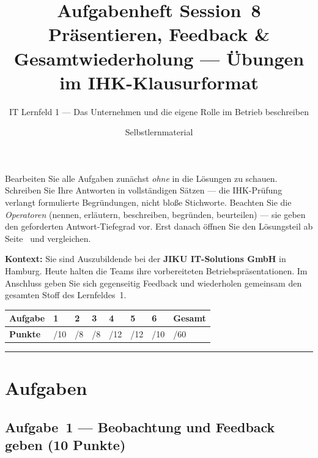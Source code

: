 \documentclass[11pt, a4paper]{article}
\title{\vspace*{-1.5cm}\Huge\bfseries\color{bfwPrimaryDark}Aufgabenheft Session~8\\[0.4em]
  \large\color{bfwInkSoft}\textnormal{Präsentieren, Feedback \& Gesamtwiederholung --- Übungen im IHK-Klausurformat}}
\author{\textsf{IT Lernfeld 1 --- Das Unternehmen und die eigene Rolle im Betrieb beschreiben}}
\date{Selbstlernmaterial}
\begin{document}
\maketitle
\thispagestyle{empty}

\begin{merksatz}[title={\bfseries So nutzen Sie dieses Aufgabenheft}]
Bearbeiten Sie alle Aufgaben zunächst \emph{ohne} in die Lösungen zu schauen. Schreiben
Sie Ihre Antworten in vollständigen Sätzen --- die IHK-Prüfung verlangt formulierte
Begründungen, nicht bloße Stichworte. Beachten Sie die \emph{Operatoren} (nennen,
erläutern, beschreiben, begründen, beurteilen) --- sie geben den geforderten
Antwort-Tiefegrad vor. Erst danach öffnen Sie den Lösungsteil ab Seite~\pageref{loesungen}
und vergleichen.
\end{merksatz}

\bigskip

\textbf{Kontext:} Sie sind Auszubildende bei der \textbf{JIKU IT-Solutions GmbH} in Hamburg.
Heute halten die Teams ihre vorbereiteten Betriebspräsentationen. Im Anschluss geben Sie
sich gegenseitig Feedback und wiederholen gemeinsam den gesamten Stoff des Lernfeldes~1.

\bigskip

\noindent
\begin{tabular}{|l|l|l|l|l|l|l|l|}
\hline
\textbf{Aufgabe} & 1 & 2 & 3 & 4 & 5 & 6 & \textbf{Gesamt}\\
\hline
\textbf{Punkte} & /10 & /8 & /8 & /12 & /12 & /10 & /60\\
\hline
\end{tabular}

\tableofcontents
\vspace{1em}
\hrule

\section{Aufgaben}

\subsection*{Aufgabe~1 --- Beobachtung und Feedback geben (10 Punkte)}
\end{document}
